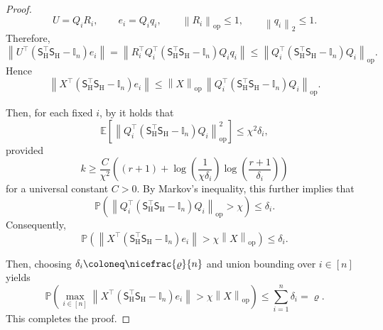 \documentclass[11pt]{article}
\theoremstyle{definition}
\theoremstyle{plain}
\providecommand{\brI}{\mathbb{I}}
\newcommand{\Norm}[1]{\left\| #1 \right\|}
\providecommand{\norm}[1]{\Norm{#1}}
\providecommand{\bbE}{\mathbb{E}}
\providecommand{\E}[1]{\bbE \left[ #1 \right]}
\begin{document}
\begin{proof}
\begin{equation}
    U = Q_iR_i, \qquad e_i = Q_i q_i, \qquad \norm{R_i}_{\mathrm{op}}\le 1, \qquad \norm{q_i}_2\le 1.
\end{equation}
Therefore,
\begin{equation}
    \norm{U^\top\left(\mathsf{S}_{\mathrm{H}}^\top \mathsf{S}_{\mathrm{H}}-\brI_n\right)e_i} = \norm{R_i^\top Q_i^\top\left(\mathsf{S}_{\mathrm{H}}^\top \mathsf{S}_{\mathrm{H}}-\brI_n\right)Q_i q_i} \le \norm{Q_i^\top\left(\mathsf{S}_{\mathrm{H}}^\top \mathsf{S}_{\mathrm{H}}-\brI_n\right)Q_i}_{\mathrm{op}}.
\end{equation}
Hence
\begin{equation}
\norm{X^\top\left(\mathsf{S}_{\mathrm{H}}^\top \mathsf{S}_{\mathrm{H}}-\brI_n\right)e_i}
\le
\norm{X}_{\mathrm{op}}\,
\norm{Q_i^\top\left(\mathsf{S}_{\mathrm{H}}^\top \mathsf{S}_{\mathrm{H}}-\brI_n\right)Q_i}_{\mathrm{op}}.
\end{equation}

Then, for each fixed $i$, by \citet[Theorem.~9]{cohen2016optimal_amm} it holds that 
\begin{equation}
    \E{\norm{Q_i^\top\left(\mathsf{S}_{\mathrm{H}}^\top \mathsf{S}_{\mathrm{H}}-\brI_n\right)Q_i}_{\mathrm{op}}^{2}} \le \chi^2 \delta_i,
\end{equation}
provided
\begin{equation}
    k \geq \frac{C}{\chi^{2}} \left( (r+1)+\log\left(\frac{1}{\chi\delta_i}\right)\log\left(\frac{r+1}{\delta_i}\right)\right)
\end{equation}
for a universal constant $C>0$. By Markov's inequality, this further implies that 
\begin{equation}
    \mathbb{P}\left(\norm{Q_i^\top\left(\mathsf{S}_{\mathrm{H}}^\top \mathsf{S}_{\mathrm{H}}-\brI_n\right)Q_i}_{\mathrm{op}}>\chi\right) \leq \delta_i.
\end{equation}
Consequently,
\begin{equation}
    \mathbb{P}\left(\norm{X^\top\left(\mathsf{S}_{\mathrm{H}}^\top \mathsf{S}_{\mathrm{H}}-\brI_n\right)e_i} > \chi \norm{X}_{\mathrm{op}}\right) \leq \delta_i.
\end{equation}

Then, choosing $\delta_i \coloneq \nicefrac{\varrho}{n}$ and union bounding over $i\in[n]$ yields
\begin{equation}
    \mathbb{P}\left( \max_{i\in[n]} \norm{X^\top\left(\mathsf{S}_{\mathrm{H}}^\top \mathsf{S}_{\mathrm{H}}-\brI_n\right)e_i} > \chi \norm{X}_{\mathrm{op}} \right) \leq \sum_{i=1}^n \delta_i = \varrho.
\end{equation}
This completes the proof. 
\end{proof}
\end{document}

